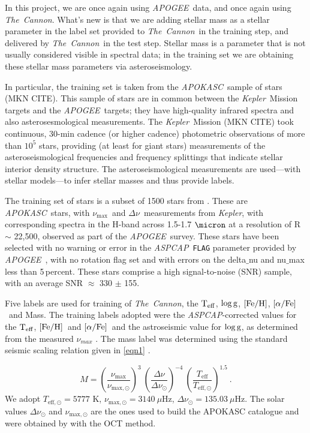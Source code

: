 \documentclass[12pt, preprint]{aastex}
\newcommand{\project}[1]{\textsl{#1}}
\newcommand{\tc}{\project{The~Cannon}}
\newcommand{\apogee}{\project{APOGEE}}
\newcommand{\apokasc}{\project{APOKASC}}
\newcommand{\aspcap}{\project{ASPCAP}}
\newcommand{\kepler}{\project{Kepler}}
\newcommand{\code}[1]{\texttt{#1}}
\newcommand{\teff}{\mbox{$\rm T_{eff}$}}
\newcommand{\feh}{\mbox{$\rm [Fe/H]$}}
\newcommand{\alphafe}{\mbox{$\rm [\alpha/Fe]$}}
\newcommand{\logg}{\mbox{$\rm \log g$}}
\newcommand{\numax}{$\nu_{\max}$}
\newcommand{\deltanu}{$\Delta\nu$}
\begin{document}
In this project, we are once again using \apogee\ data, and once again
using \tc.
What's new is that we are adding stellar mass as a stellar parameter
in the label set provided to \tc\ in the training step, and delivered by
\tc\ in the test step.
Stellar mass is a parameter that is not usually considered visible in
spectral data; in the training set we are obtaining these stellar mass
parameters via asteroseismology.

In particular, the training set is taken from the \apokasc\ sample of
stars (MKN CITE).
This sample of stars are in common between the \kepler\ Mission
targets and the \apogee\ targets; they have high-quality infrared
spectra and also asterosesmological measurements.
The \kepler\ Mission (MKN CITE) took continuous, 30-min cadence (or
higher cadence) photometric observations of more than $10^5$ stars,
providing (at least for giant stars) measurements of the
asteroseismological frequencies and frequency splittings that indicate
stellar interior density structure.
The asteroseismological measurements are used---with stellar
models---to infer stellar masses and thus provide labels.

The training set of stars is a subset of 1500 stars from \citet{Martig2015}. These are \apokasc\ stars, with \numax\ and \deltanu\ measurements from \kepler, with corresponding spectra in the H-band across 1.5-1.7 $\micron$ at a resolution of R $\sim$ 22,500, observed as part of the \apogee\ survey. These stars have been selected with no warning or error in the \aspcap\ \code{FLAG} parameter provided by \apogee\ \citep{Ahn2014}, with no rotation flag set and with errors on the delta$\_$nu and nu$\_$max less than 5\,percent. These stars comprise a high signal-to-noise (SNR) sample, with an average SNR $\approx$ 330 $\pm$ 155. 

Five labels are used for training of \tc, the \teff, \logg, \feh, \alphafe\ and Mass. The training labels adopted were the \aspcap-corrected \citep{Meszaros2013} values for the \teff, \feh\ and \alphafe\ and the astroseismic value for \logg, as determined from the measured $\nu_{max}$ . The mass label was determined using the standard seismic scaling relation given in \ref{eqn1} \citep{SilvaAguirre2011,Chaplin2011}.

\begin{equation} \label{eq:mass}
M= \left( \frac{\nu_{\mathrm{max}}}{\nu_{\mathrm{max,\odot}}}\right)^3\  \left( \frac{\Delta \nu}{\Delta \nu_{\odot}}\right)^{-4} \ \left( \frac{T_{\mathrm{eff}}}{T_{\mathrm{eff,\odot}}}\right)^{1.5} \ .
\label{eq1}
\end{equation}
We adopt  $T_{\mathrm{eff,\odot}}=5777$ K, $\nu_{\mathrm{max,\odot}}=3140\ \mu$Hz, $\Delta \nu_{\odot}=135.03\ \mu$Hz. The solar values  $\Delta \nu_{\odot}$ and $\nu_{\mathrm{max,\odot}}$ are the ones used to build the APOKASC catalogue and were obtained by \cite{Hekker2013} with the OCT method.
\end{document}
